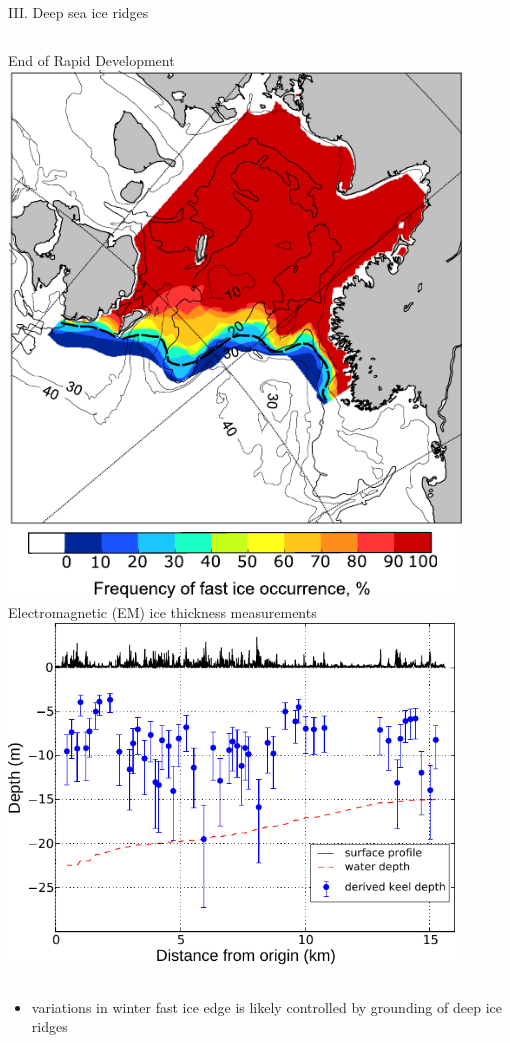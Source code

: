 \documentclass[8pt]{beamer}
\begin{document}
\setwatermark{\fontsize{125pt}{125pt}\selectfont{}}
\begin{frame}[fragile]{III. Deep sea ice ridges}
\begin{columns}
	End of Rapid Development
		\includegraphics[width=0.9\textwidth]{./img/Rgrth_freqency.pdf}
	Electromagnetic (EM) ice thickness measurements
		\includegraphics[width=0.9\textwidth]{./img/EM_profile.pdf}
	\end{columns}
\begin{itemize}
	\item variations in winter fast ice edge is likely controlled by grounding of deep ice ridges
\end{itemize}
\end{frame}
\end{document}
